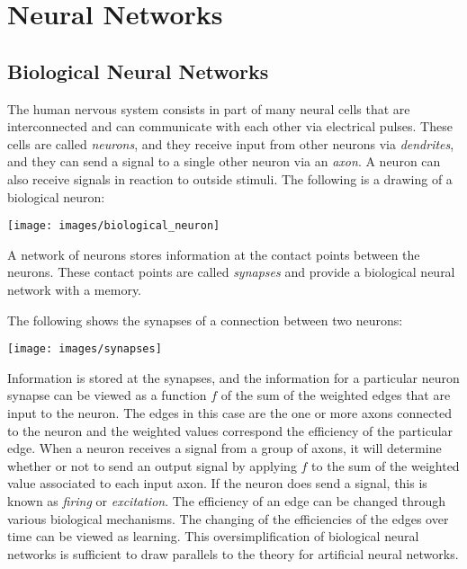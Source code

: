 \chapter[Neural Networks]{Neural Networks}

\section{Biological Neural Networks}

The human nervous system consists in part of many neural cells that are interconnected and can communicate with each other via electrical pulses.
These cells are called {\it neurons}, and they receive input from other neurons via {\it dendrites}, and they can send a signal to a single other neuron via an {\it axon}.
A neuron can also receive signals in reaction to outside stimuli.
The following is a drawing of a biological neuron: 

\texttt{[image: images/biological\_neuron]}

A network of neurons stores information at the contact points between the neurons.
These contact points are called {\it synapses} and provide a biological neural network with a memory.

The following shows the synapses of a connection between two neurons:

\texttt{[image: images/synapses]}

Information is stored at the synapses, and the information for a particular neuron synapse can be viewed as a function $f$ of the sum of the weighted edges that are input to the neuron.
The edges in this case are the one or more axons connected to the neuron and the weighted values correspond the efficiency of the particular edge. 
When a neuron receives a signal from a group of axons, it will determine whether or not to send an output signal by applying $f$ to the sum of the weighted value associated to each input axon.
If the neuron does send a signal, this is known as {\it firing} or {\it excitation}.
The efficiency of an edge can be changed through various biological mechanisms.
The changing of the efficiencies of the edges over time can be viewed as learning.
This oversimplification of biological neural networks is sufficient to draw parallels to the theory for artificial neural networks.


